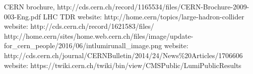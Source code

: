 \begin{thebibliography}{1}
 CERN brochure, http://cds.cern.ch/record/1165534/files/CERN-Brochure-2009-003-Eng.pdf
 LHC TDR
 website: http://home.cern/topics/large-hadron-collider
 website: http://cds.cern.ch/record/1621583/files/
 http://home.cern/sites/home.web.cern.ch/files/image/update-for\_cern\_people/2016/06/intlumirunall\_image.png 
 website: http://cds.cern.ch/journal/CERNBulletin/2014/24/News\%20Articles/1706606
 website: https://twiki.cern.ch/twiki/bin/view/CMSPublic/LumiPublicResults


\end{thebibliography}
